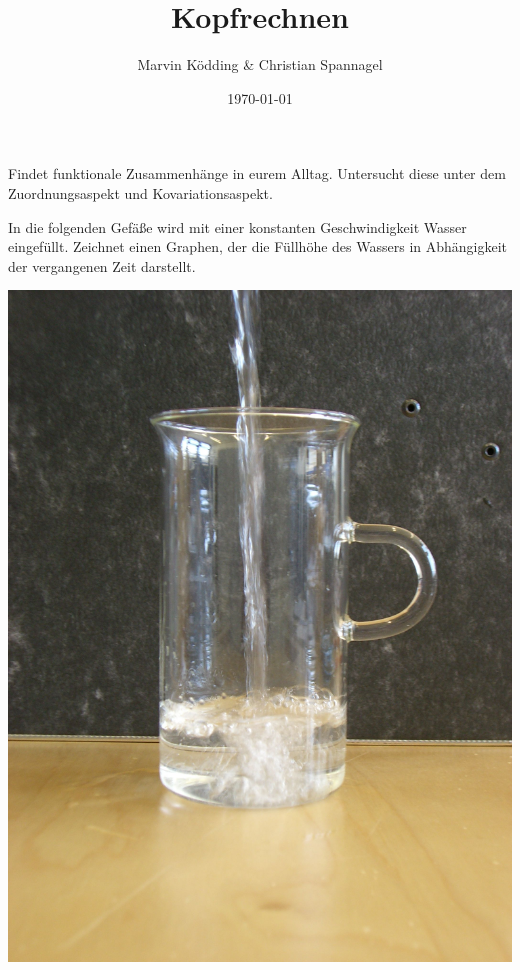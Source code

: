 \documentclass{cssheet}
\title{Kopfrechnen}
\author{Marvin Ködding \& Christian Spannagel}
\date{\today}
\begin{document}
\printtitle

\begin{aufgabe}
	Findet funktionale Zusammenhänge in eurem Alltag. Untersucht diese unter dem Zuordnungsaspekt und Kovariationsaspekt.
\end{aufgabe}

\begin{aufgabe}[Füllgraphen]
	In die folgenden Gefäße wird mit einer konstanten \glqq{}Geschwindigkeit\grqq{} Wasser eingefüllt. Zeichnet einen Graphen, der die Füllhöhe des Wassers in Abhängigkeit der vergangenen Zeit darstellt.
	
	\begin{minipage}{.33\textwidth}
		\includegraphics[width=\linewidth]{Gefaess_A_1.jpg}
	\end{minipage}
	\begin{minipage}{.33\textwidth}

\end{minipage}
\end{aufgabe}
\end{document}
